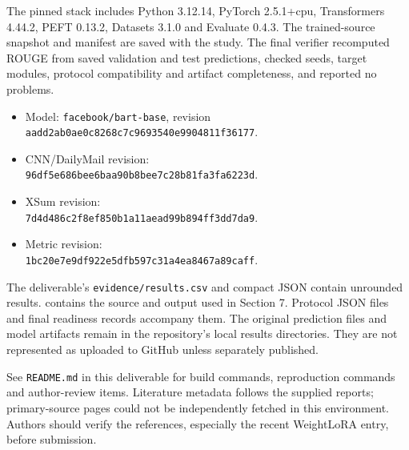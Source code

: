 \documentclass[11pt,letterpaper]{article}
\begin{document}
The pinned stack includes Python 3.12.14, PyTorch 2.5.1+cpu, Transformers 4.44.2, PEFT 0.13.2, Datasets 3.1.0 and Evaluate 0.4.3. The trained-source snapshot and manifest are saved with the study. The final verifier recomputed ROUGE from saved validation and test predictions, checked seeds, target modules, protocol compatibility and artifact completeness, and reported no problems.
\begin{itemize}
\item Model: \texttt{facebook/bart-base}, revision\\\texttt{aadd2ab0ae0c8268c7c9693540e9904811f36177}.
\item CNN/DailyMail revision:\\\texttt{96df5e686bee6baa90b8bee7c28b81fa3fa6223d}.
\item XSum revision:\\\texttt{7d4d486c2f8ef850b1a11aead99b894ff3dd7da9}.
\item Metric revision:\\\texttt{1bc20e7e9df922e5dfb597c31a4ea8467a89caff}.
\end{itemize}
The deliverable's \texttt{evidence/results.csv} and compact JSON contain unrounded results.  contains the source and output used in Section 7. Protocol JSON files and final readiness records accompany them. The original prediction files and model artifacts remain in the repository's local results directories. They are not represented as uploaded to GitHub unless separately published.

See \texttt{README.md} in this deliverable for build commands, reproduction commands and author-review items. Literature metadata follows the supplied reports; primary-source pages could not be independently fetched in this environment. Authors should verify the references, especially the recent WeightLoRA entry, before submission.
\end{document}
